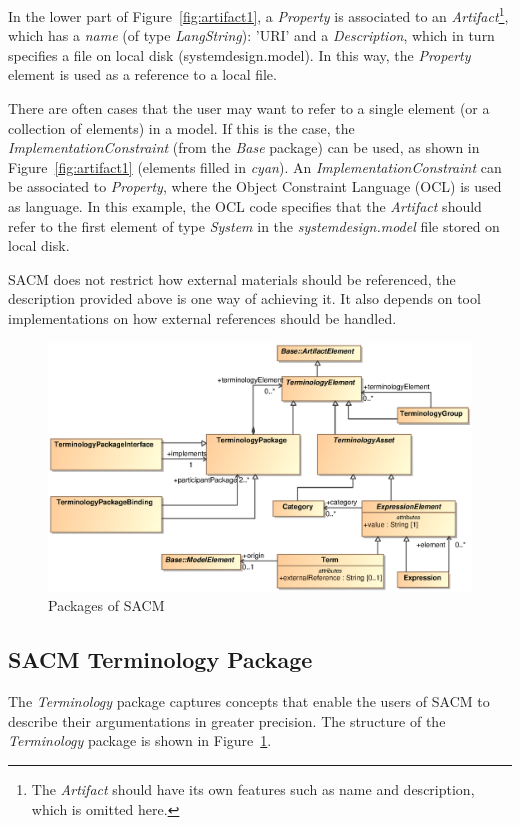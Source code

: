 In the lower part of Figure~\ref{fig:artifact1}, a \textit{Property} is associated to an \textit{Artifact}\footnote{The \textit{Artifact} should have its own features such as name and description, which is omitted here.}, which has a \textit{name} (of type \textit{LangString}): 'URI' and a \textit{Description}, which in turn specifies a file on local disk (systemdesign.model). In this way, the \textit{Property} element is used as a reference to a local file. 

There are often cases that the user may want to refer to a single element (or a collection of elements) in a model. If this is the case, the \textit{ImplementationConstraint} (from the \textit{Base} package) can be used, as shown in Figure~\ref{fig:artifact1} (elements filled in \textit{cyan}). An \textit{ImplementationConstraint} can be associated to \textit{Property}, where the Object Constraint Language (OCL) is used as language. In this example, the OCL code specifies that the \textit{Artifact} should refer to the first element of type \textit{System} in the \textit{systemdesign.model} file stored on local disk. 

SACM does not restrict how external materials should be referenced, the description provided above is one way of achieving it. It also depends on tool implementations on how external references should be handled. 
\begin{figure}[ht!]
	\centering
	\includegraphics[width=1\linewidth]{fig/Terminology.eps}
	\caption{Packages of SACM}
	\label{fig:term}
\end{figure}
\subsection{SACM Terminology Package}
\label{sec:termPack}
The \textit{Terminology} package captures concepts that enable the users of SACM to describe their argumentations in greater precision. The structure of the \textit{Terminology} package is shown in Figure~\ref{fig:term}.

